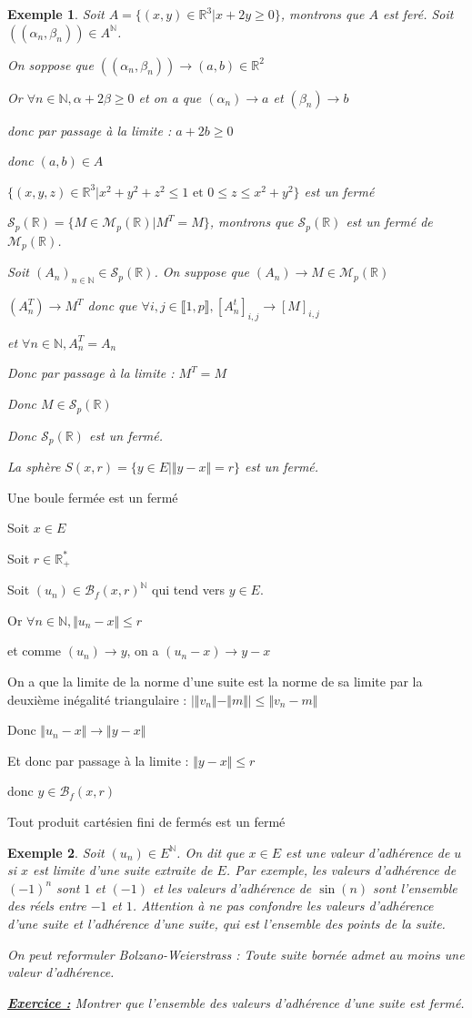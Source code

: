 \documentclass[a4paper,12pt]{book}
\newcommand{\Prop}[2]{\begin{tcolorbox}[sharp corners, colback=white,colframe=red!90!black!75, title=Proposition : #1]#2\end{tcolorbox}}
\newcommand{\Pre}[1]{\begin{tcolorbox}[sharp corners, colback=white,colframe=green!60!green!30!black!75, title=Preuve]#1\end{tcolorbox}}
\newtheorem{Exe}{Exemple}[section]
\def\R{\mathbb{R}}
\def\N{\mathbb{N}}
\begin{document}
\begin{Exe}
Soit $A=\{(x,y)\in\R^3\vert x+2y\geq 0\}$, montrons que $A$ est feré. Soit $((\alpha_n,\beta_n))\in A^\N$. \par On soppose que $((\alpha_n, \beta_n))\to (a,b)\in\R^2$ \par Or $\forall n\in\N, \alpha+2\beta\geq 0$ et on a que $(\alpha_n)\to a$ et $(\beta_n)\to b$ \par donc par passage à la limite : $a+2b\geq 0$ \par donc $(a,b)\in A$
\par $\{(x,y,z)\in\R^3\vert x^2+y^2+z^2\leq 1\text{ et } 0\leq z\leq x^2+y^2\}$ est un fermé
\par $\mathcal{S}_p(\R)=\{M\in\mathcal{M}_p(\R)\vert M^T=M\}$, montrons que $\mathcal{S}_p(\R)$ est un fermé de $\mathcal{M}_p(\R)$. \par Soit $(A_n)_{n\in\N}\in\mathcal{S}_p(\R)$. On suppose que $(A_n)\to M\in\mathcal{M}_p(\R)$ \par $(A_n^T)\to M^T$ donc que $\forall i,j\in\llbracket 1,p\rrbracket, [A_n^t]_{i,j}\to [M]_{i,j}$ \par et $\forall n\in\N, A_n^T=A_n$ \par Donc par passage à la limite : $M^T=M$ \par Donc $M\in\mathcal{S}_p(\R)$ \par Donc $\mathcal{S}_p(\R)$ est un fermé.
\par La sphère $S(x,r)=\{y\in E\vert\Vert y-x\Vert=r\}$ est un fermé.
\end{Exe}
\Prop{Fermeture de la boule}{Une boule fermée est un fermé}
\Pre{Soit $x\in E$ \par Soit $r\in\R_+^*$\par Soit $(u_n)\in\mathcal{B}_f(x,r)^\N$ qui tend vers $y\in E$. \par Or $\forall n\in \N, \Vert u_n-x\Vert \leq r$ \par et comme $(u_n)\to y$, on a $(u_n-x)\to y-x$\par On a que la limite de la norme d'une suite est la norme de sa limite par la deuxième inégalité triangulaire : $\vert\Vert v_n\Vert - \Vert m\Vert\vert\leq\Vert v_n-m\Vert$ \par Donc $\Vert u_n-x\Vert\to \Vert y-x\Vert$
\par Et donc par passage à la limite : $\Vert y-x\Vert\leq r$\par donc $y\in\mathcal{B}_f(x,r)$}
\Prop{Produit de fermés}{Tout produit cartésien fini de fermés est un fermé}
\begin{Exe}
Soit $(u_n)\in E^\N$. On dit que $x\in E$ est une valeur d'adhérence de $u$ si $x$ est limite d'une suite extraite de $E$. Par exemple, les valeurs d'adhérence de $(-1)^n$ sont $1$ et $(-1)$ et les valeurs d'adhérence de $\sin(n)$ sont l'ensemble des réels entre $-1$ et $1$. Attention à ne pas confondre les valeurs d'adhérence d'une suite et l'adhérence d'une suite, qui est l'ensemble des points de la suite.
\par On peut reformuler Bolzano-Weierstrass : Toute suite bornée admet au moins une valeur d'adhérence.
\par \underline{\textbf{Exercice :}} Montrer que l'ensemble des valeurs d'adhérence d'une suite est fermé. 
\end{Exe}
\end{document}
